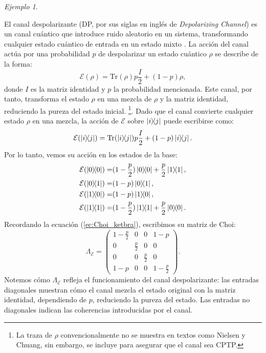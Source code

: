 \documentclass[letterpaper,12pt]{thesisECFM}
\theoremstyle{plain}
\theoremstyle{definition}
\theoremstyle{definition}
\theoremstyle{remark}
\newcommand{\1}{\mathbb{1}}
\newtheorem{ex}{Ejemplo}[section]
\begin{document}
\begin{ex} \label{Ejemplo 1.0.1} 
\end{ex}
El canal despolarizante  (DP, por sus siglas en inglés de \textit{Depolarizing Channel})  es un canal cuántico que introduce ruido aleatorio en un sistema, transformando cualquier estado cuántico de entrada en un estado mixto \cite{nielsen_chuang_2011}. La acción del canal actúa por una probabilidad $p$ de despolarizar un estado cuántico $\rho$ se describe de la forma:
\begin{equation} \label{ec:superop_depolarizing}
\mathcal{E}(\rho) = \text{Tr}(\rho) p  \frac{I}{2}   + (1 - p)\rho,
\end{equation}
donde $I$ es la matriz identidad y $p$ la probabilidad mencionada. Este canal, por tanto, transforma el estado $\rho$ en una mezcla de $\rho$ y la matriz identidad, reduciendo la pureza del estado inicial. \footnote{La traza de $\rho$ convencionalmente no se muestra en textos como Nielsen y Chuang, sin embargo,  se incluye para asegurar que el canal sea CPTP.}. Dado que el canal  convierte cualquier estado $\rho$ en una mezcla, la acción de $\mathcal{E}$ sobre $\ketbra{i}{j}$ puede escribirse como:
\begin{equation}
\mathcal{E}(\ketbra{i}{j}) = \text{Tr}(\ketbra{i}{j})  p \frac{I}{2}+ (1 - p) \ketbra{i}{j}.
\end{equation}
Por lo tanto, vemos su acción en los estados de la base:
\begin{alignat*}{2}
     \mathcal{E}(\ketbra{0}) = & (1 - \frac{p}{2}) \ketbra{0} + \frac{p}{2} \ketbra{1}, \\
     \mathcal{E}(\ketbra{0}{1}) = & (1 - p) \ketbra{0}{1},\\
      \mathcal{E}(\ketbra{1}{0}) = & (1 - p) \ketbra{1}{0},\\
           \mathcal{E}(\ketbra{1}) = & (1 - \frac{p}{2}) \ketbra{1} + \frac{p}{2} \ketbra{0}.
\end{alignat*}
Recordando la ecuación (\ref{ec:Choi_ketbra}), escribimos su matriz de Choi:
\begin{equation}\label{ec:choi_depolarizing}
    \Lambda_\mathcal{E} = 
\begin{pmatrix}
1 - \frac{p}{2} & 0 & 0 & 1 - p \\
0 & \frac{p}{2} & 0 & 0 \\
0 & 0 & \frac{p}{2} & 0 \\
1 - p & 0 & 0 & 1 - \frac{p}{2}
\end{pmatrix}.
\end{equation}
Notemos cómo $\Lambda_{\mathcal{E}}$ refleja el funcionamiento del canal despolarizante: las entradas diagonales muestran cómo el canal mezcla el estado original con la matriz identidad, dependiendo de $p$, reduciendo la pureza del estado. Las entradas no diagonales indican las coherencias introducidas por el canal.
\end{document}
